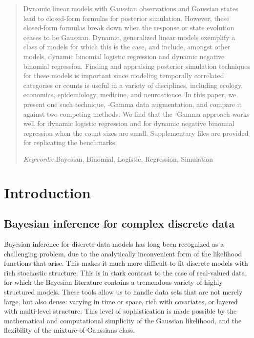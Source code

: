 
\begin{abstract}
Dynamic linear models with Gaussian observations and Gaussian states lead to
closed-form formulas for posterior simulation.  However, these closed-form
formulas break down when the response or state evolution ceases to be Gaussian.
Dynamic, generalized linear models exemplify a class of models for which this is
the case, and include, amongst other models, dynamic binomial logistic
regression and dynamic negative binomial regression.  Finding and appraising
posterior simulation techniques for these models is important since modeling
temporally correlated categories or counts is useful in a variety of
disciplines, including ecology, economics, epidemiology, medicine, and
neuroscience.  In this paper, we present one such technique, \Polya-Gamma data
augmentation, and compare it against two competing methods.  We find that the
\Polya-Gamma approach works well for dynamic logistic regression and for dynamic
negative binomial regression when the count sizes are small.  Supplementary
files are provided for replicating the benchmarks.

\noindent %
{\it Keywords:} {Bayesian, Binomial, Logistic, Regression, Simulation}
\end{abstract}


\doublespace

\section{Introduction}

\subsection{Bayesian inference for complex discrete data}

Bayesian inference for discrete-data models has long been recognized as a
challenging problem, due to the analytically inconvenient form of the likelihood
functions that arise.  This makes it much more difficult to fit discrete models
with rich stochastic structure.  This is in stark contrast to the case of
real-valued data, for which the Bayesian literature contains a tremendous
variety of highly structured models.  These tools allow us to handle data sets
that are not merely large, but also dense: varying in time or space, rich with
covariates, or layered with multi-level structure.  This level of sophistication
is made possible by the mathematical and computational simplicity of the
Gaussian likelihood, and the flexibility of the mixture-of-Gaussians class.

